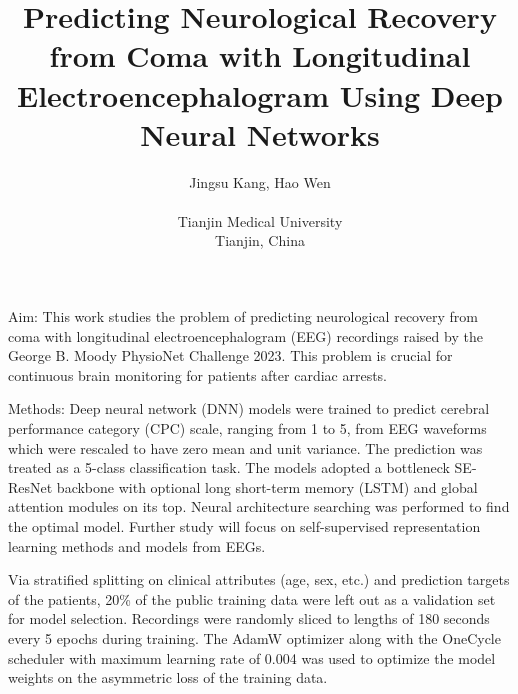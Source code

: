 \documentclass{cinc-abstract}
\begin{document}
\title{Predicting Neurological Recovery from Coma with Longitudinal Electroencephalogram Using Deep Neural Networks}

\author {Jingsu Kang, Hao Wen\\ %
\ \\ %
Tianjin Medical University\\  %
Tianjin, China} %

\maketitle



Aim: This work studies the problem of predicting neurological recovery from coma with longitudinal electroencephalogram (EEG) recordings raised by the George B. Moody PhysioNet Challenge 2023. This problem is crucial for continuous brain monitoring for patients after cardiac arrests.

Methods: Deep neural network (DNN) models were trained to predict cerebral performance category (CPC) scale, ranging from 1 to 5, from EEG waveforms which were rescaled to have zero mean and unit variance. The prediction was treated as a 5-class classification task. The models adopted a bottleneck SE-ResNet backbone with optional long short-term memory (LSTM) and global attention modules on its top. Neural architecture searching was performed to find the optimal model. Further study will focus on self-supervised representation learning methods and models from EEGs.

Via stratified splitting on clinical attributes (age, sex, etc.) and prediction targets of the patients, 20\% of the public training data were left out as a validation set for model selection. Recordings were randomly sliced to lengths of 180 seconds every 5 epochs during training. The AdamW optimizer along with the OneCycle scheduler with maximum learning rate of 0.004 was used to optimize the model weights on the asymmetric loss of the training data.
\end{document}
